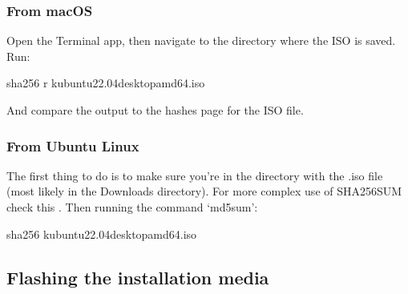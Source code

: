 \documentclass[letterpaper,10pt,english]{sphinxmanual}
\begin{document}
\subsubsection{From macOS}
\label{\detokenize{docs/installation:from-macos}}
\sphinxAtStartPar
Open the Terminal app, then navigate to the directory where the ISO is saved.
Run:

\begin{sphinxVerbatim}[commandchars=\\\{\}]
sha256 \PYGZhy{}r kubuntu\PYGZhy{}22.04\PYGZhy{}desktop\PYGZhy{}amd64.iso
\end{sphinxVerbatim}

\sphinxAtStartPar
And compare the output to the hashes page for the ISO file.


\subsubsection{From Ubuntu Linux}
\label{\detokenize{docs/installation:from-ubuntu-linux}}
\sphinxAtStartPar
The first thing to do is to make sure you’re in the directory with the .iso file (most likely in the Downloads directory). For more complex use of SHA256SUM check this . Then running the command ‘md5sum’:

\begin{sphinxVerbatim}[commandchars=\\\{\}]
sha256 kubuntu\PYGZhy{}22.04\PYGZhy{}desktop\PYGZhy{}amd64.iso
\end{sphinxVerbatim}


\subsection{Flashing the installation media}
\label{\detokenize{docs/installation:flashing-the-installation-media}}
\end{document}
